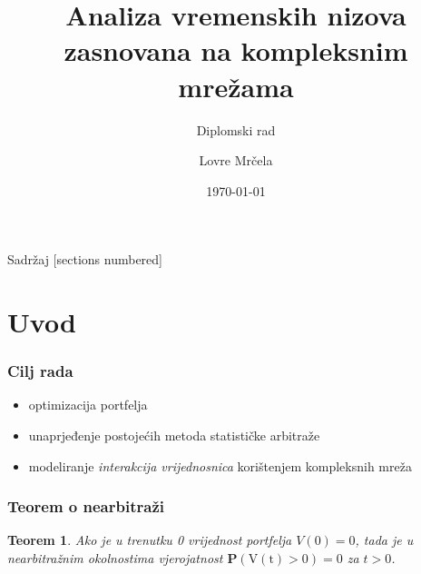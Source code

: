 \documentclass[11pt, notheorems]{beamer}
\newtheorem{theorem}{Teorem}
\newcommand{\q}{\left}
\newcommand{\w}{\right}
\newcommand{\prob}[1]{\operatorname{\mathbf{P} \q(#1\w)}}
\begin{document}
  \author{Lovre Mrčela}
  \title{Analiza vremenskih nizova zasnovana na kompleksnim mrežama}
  \subtitle{Diplomski rad}
  \date{\today}

  \begin{frame}[plain]
  \maketitle
  \end{frame}

  \begin{frame}{Sadržaj}
    [sections numbered]
    \tableofcontents[hideallsubsections]
  \end{frame}
  
  \section{Uvod}
  \begin{frame}
    \frametitle{Cilj rada}
    \begin{itemize}
    \item optimizacija portfelja
    \item unaprjeđenje postojećih metoda \alert{statističke arbitraže}
    \item modeliranje \emph{interakcija vrijednosnica} korištenjem \alert{kompleksnih mreža}
    \end{itemize}
  \end{frame}

  \begin{frame}
    \frametitle{Teorem o nearbitraži}
    \begin{theorem}
      Ako je u trenutku 0 vrijednost portfelja $V\q(0\w) = 0$, tada je u nearbitražnim okolnostima vjerojatnost $\prob{V\q(t\w) > 0} = 0$ za $t > 0$.
    \end{theorem}
  \end{frame}
\end{document}
